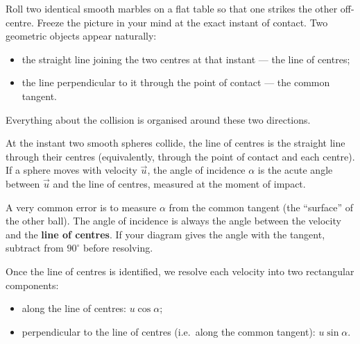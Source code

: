 \documentclass[11pt]{article}
\newcommand{\cle}[1]{{\popxbold\color{popdark}#1}}
\newcounter{popsec}
\newcounter{popsub}
\newcommand{\courssub}[1]{%
  \stepcounter{popsub}%
  \par\vspace{9pt}\noindent{\popxbold\fontsize{11.5}{13}\selectfont\color{popink}{\color{poporange}\thepopsec.\thepopsub}\hspace{6pt}#1}\par\nopagebreak\vspace{4pt}
}
\begin{document}
\begin{experience}
Roll two identical smooth marbles on a flat table so that one strikes the other off-centre. Freeze the picture in your mind at the exact instant of contact. Two geometric objects appear naturally:
\begin{itemize}
\item the straight line joining the two centres at that instant --- the \cle{line of centres};
\item the line perpendicular to it through the point of contact --- the \cle{common tangent}.
\end{itemize}
Everything about the collision is organised around these two directions.
\end{experience}

\begin{definition}
At the instant two smooth spheres collide, the \cle{line of centres} is the straight line through their centres (equivalently, through the point of contact and each centre). If a sphere moves with velocity $\vec{u}$, the \cle{angle of incidence} $\alpha$ is the acute angle between $\vec{u}$ and the line of centres, measured at the moment of impact.
\end{definition}

\begin{attention}
A very common error is to measure $\alpha$ from the common tangent (the ``surface'' of the other ball). The angle of incidence is always the angle between the velocity and the \textbf{line of centres}. If your diagram gives the angle with the tangent, subtract from $90^{\circ}$ before resolving.
\end{attention}

\courssub{Resolving the Velocities}

Once the line of centres is identified, we resolve each velocity into two rectangular components:
\begin{itemize}
\item along the line of centres: $u\cos\alpha$;
\item perpendicular to the line of centres (i.e.\ along the common tangent): $u\sin\alpha$.
\end{itemize}
\end{document}
